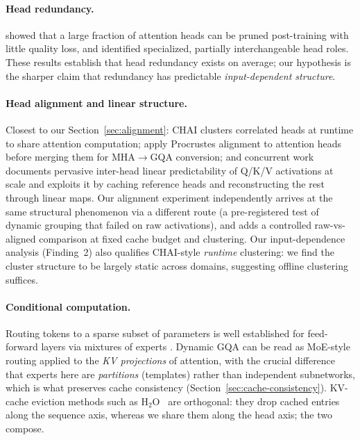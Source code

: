 \documentclass{article}
\begin{document}
\paragraph{Head redundancy.}
\citet{michel2019sixteen} showed that a large fraction of attention heads can
be pruned post-training with little quality loss, and
\citet{voita2019analyzing} identified specialized, partially interchangeable
head roles. These results establish that head redundancy exists on average;
our hypothesis is the sharper claim that redundancy has predictable
\emph{input-dependent structure}.

\paragraph{Head alignment and linear structure.}
Closest to our Section~\ref{sec:alignment}: CHAI \citep{agarwal2024chai}
clusters correlated heads at runtime to share attention computation;
\citet{jin2024align} apply Procrustes alignment to attention heads before
merging them for MHA$\to$GQA conversion; and concurrent work
\citep{shaikh2026linear} documents pervasive inter-head linear
predictability of Q/K/V activations at scale and exploits it by caching
reference heads and reconstructing the rest through linear maps. Our
alignment experiment independently arrives at the same structural
phenomenon via a different route (a pre-registered test of dynamic
grouping that failed on raw activations), and adds a controlled
raw-vs-aligned comparison at fixed cache budget and clustering. Our
input-dependence analysis (Finding~2) also qualifies CHAI-style
\emph{runtime} clustering: we find the cluster structure to be largely
static across domains, suggesting offline clustering suffices.

\paragraph{Conditional computation.}
Routing tokens to a sparse subset of parameters is well established for
feed-forward layers via mixtures of experts
\citep{shazeer2017outrageously,fedus2022switch}. Dynamic GQA can be read as
MoE-style routing applied to the \emph{KV projections} of attention, with
the crucial difference that experts here are \emph{partitions} (templates)
rather than independent subnetworks, which is what preserves cache
consistency (Section~\ref{sec:cache-consistency}). KV-cache eviction methods
such as H$_2$O~\citep{zhang2023h2o} are orthogonal: they drop cached entries
along the sequence axis, whereas we share them along the head axis; the two
compose.
\end{document}

